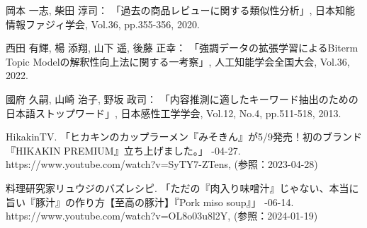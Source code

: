\documentclass{ltjarticle}
\begin{document}
\begin{thebibliography}{99}
    岡本 一志, 柴田 淳司：
    \newblock 「過去の商品レビューに関する類似性分析」,
    \newblock 日本知能情報ファジィ学会, Vol.36, pp.355-356, 2020.

    西田 有輝, 楊 添翔, 山下 遥, 後藤 正幸：
    \newblock 「強調データの拡張学習によるBiterm Topic Modelの解釈性向上法に関する一考察」,
    \newblock 人工知能学会全国大会, Vol.36, 2022.

    國府 久嗣, 山崎 治子, 野坂 政司：
    \newblock 「内容推測に適したキーワード抽出のための日本語ストップワード」,
    \newblock 日本感性工学学会, Vol.12, No.4, pp.511-518, 2013.

    HikakinTV. 「ヒカキンのカップラーメン『みそきん』が5/9発売！初のブランド『HIKAKIN PREMIUM』立ち上げました。」
    -04-27. 
    \newblock https://www.youtube.com/watch?v=SyTY7-ZTens, (参照：2023-04-28)

    料理研究家リュウジのバズレシピ. 「ただの『肉入り味噌汁』じゃない、本当に旨い『豚汁』の作り方【至高の豚汁】『Pork miso soup』」
    -06-14. 
    \newblock https://www.youtube.com/watch?v=OL8o03u8l2Y,  (参照：2024-01-19)
     
\end{thebibliography}
\end{document}
